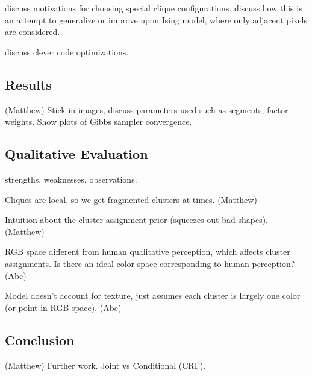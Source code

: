 \documentclass[12pt]{article}
\begin{document}
discuss motivations for choosing special clique configurations. 
discuss how this is an attempt to generalize or improve upon Ising model, where
only adjacent pixels are considered.

discuss clever code optimizations.

\subsection*{Results}(Matthew)
Stick in images, discuss parameters used such as segments, factor weights.
Show plots of Gibbs sampler convergence.


\subsection*{Qualitative Evaluation}
strengths, weaknesses, observations.

Cliques are local, so we get fragmented clusters at times. (Matthew)

Intuition about the cluster assignment prior (squeezes out bad shapes). (Matthew)


RGB space different from human qualitative perception, which affects cluster assignments.
Is there an ideal color space corresponding to human perception? (Abe)

Model doesn't account for texture, just assumes each cluster is largely one color (or point 
in RGB space). (Abe)




\subsection*{Conclusion} (Matthew)
Further work.
Joint vs Conditional (CRF).
\end{document}

